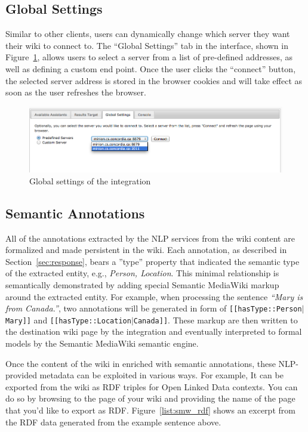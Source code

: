 \subsection{Global Settings}
Similar to other \sa clients, users can dynamically change which \sa server they want their wiki to connect to. The ``Global Settings'' tab in the \wikinlp interface, shown in Figure~\ref{fig:semassist_settings}, allows users to select a \sa server from a list of pre-defined addresses, as well as defining a custom end point. Once the user clicks the ``connect'' button, the selected server address is stored in the browser cookies and will take effect as soon as the user refreshes the browser.

\begin{figure}[h!]
\centering
\includegraphics[width=\textwidth]{pictures/semassist_settings.png}
\caption{Global settings of the \wikinlp integration}
\label{fig:semassist_settings}
\end{figure}

\subsection{Semantic Annotations}
All of the annotations extracted by the NLP services from the wiki content are formalized and made persistent in the wiki. Each annotation, as described in Section~\ref{sec:response}, bears a ''type'' property that indicated the semantic type of the extracted entity, e.g., \emph{Person, Location}. This minimal relationship is semantically demonstrated by adding special Semantic MediaWiki markup around the extracted entity. For example, when processing the sentence \emph{``Mary is from Canada.''}, two annotations will be generated in form of \texttt{[[hasType::Person$|$Mary]]} and \texttt{[[hasType::Location$|$Canada]]}. These markup are then written to the destination wiki page by the integration and eventually interpreted to formal models by the Semantic MediaWiki semantic engine.

Once the content of the wiki in enriched with semantic annotations, these NLP-provided metadata can be exploited in various ways. For example, It can be exported from the wiki as RDF triples for Open Linked Data contexts. You can do so by browsing to the  page of your wiki and providing the name of the page that you'd like to export as RDF. Figure~\ref{list:smw_rdf} shows an excerpt from the RDF data generated from the example sentence above.

